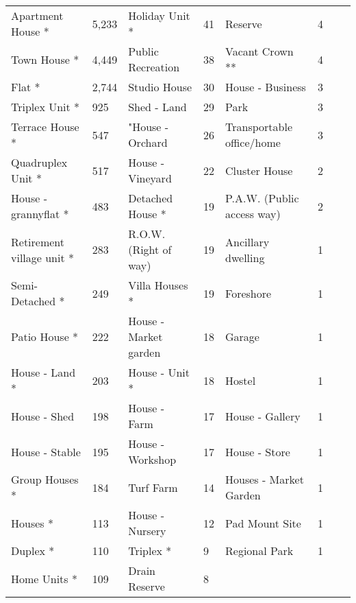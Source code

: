 \begin{table}[ht]
{\begin{threeparttable}
\begin{tabular}{llllllll}
Apartment House *         &5,233   &Holiday Unit *             &41   &Reserve                    &4\\		
Town House *              &4,449   &Public Recreation          &38   &Vacant Crown **            &4\\		
Flat *                    &2,744   &Studio House	           &30   &House - Business	         &3\\		
Triplex Unit *            &925	   &Shed - Land 	           &29   &Park                       &3\\		
Terrace House *           &547	   &"House - Orchard	       &26   &Transportable office/home  &3\\		
Quadruplex Unit *         &517	   &House - Vineyard      	   &22   &Cluster House	             &2\\		
House - grannyflat *      &483	   &Detached House *      	   &19   &P.A.W. (Public access way) &2\\		
Retirement village unit * &283	   &R.O.W. (Right of way) 	   &19   &Ancillary dwelling	     &1\\		
Semi-Detached *	      	  &249	   &Villa Houses *        	   &19   &Foreshore                  &1\\		
Patio House * 	          &222	   &House - Market garden 	   &18   &Garage                     &1\\		
House - Land *	          &203	   &House - Unit *        	   &18   &Hostel                     &1\\        		
House - Shed	          &198     &House - Farm	           &17   &House - Gallery	         &1\\		
House - Stable	          &195     &House - Workshop	       &17   &House - Store	             &1\\		
Group Houses *            &184     &Turf Farm             	   &14   &Houses - Market Garden	 &1\\		
Houses *                  &113     &House - Nursery	    	   &12   &Pad Mount Site             &1\\		
Duplex *                  &110     &Triplex *             	   &9    &Regional Park              &1\\		
Home Units *              &109     &Drain Reserve         	   &8\\		
\bottomrule\bottomrule
\end{tabular} 
\end{threeparttable}}
\end{table}